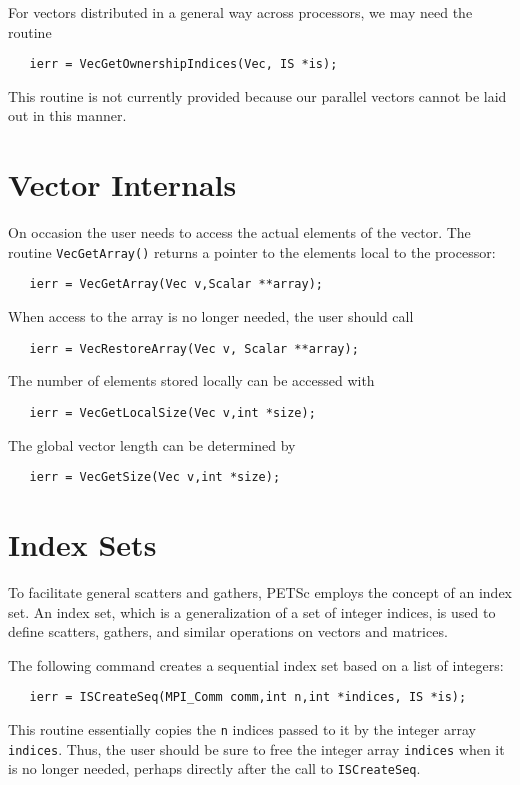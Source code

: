 \begin{design}
For vectors distributed in a general way across processors, we may need
the routine 
\begin{verbatim}
   ierr = VecGetOwnershipIndices(Vec, IS *is);
\end{verbatim}
This routine is not currently provided because our parallel vectors cannot
be laid out in this manner.
\end{design}

\section{Vector Internals}
On occasion the user needs to access the actual elements of the vector. 
The routine {\tt VecGetArray()} 
returns a pointer to the elements local to the processor:
\begin{verbatim}
   ierr = VecGetArray(Vec v,Scalar **array);
\end{verbatim}
When access to the array is no longer needed, the user should call
\begin{verbatim}
   ierr = VecRestoreArray(Vec v, Scalar **array);
\end{verbatim}
The number of elements stored locally can be accessed with
\begin{verbatim}
   ierr = VecGetLocalSize(Vec v,int *size);
\end{verbatim}
The global vector length can be determined by 
\begin{verbatim}
   ierr = VecGetSize(Vec v,int *size);
\end{verbatim}
 
\section{Index Sets} 
To facilitate general scatters and gathers, PETSc employs the 
concept of an index set.  An index set, which is a generalization of a 
set of integer indices, is used to define scatters, gathers, and similar 
operations on vectors and matrices. 

The following command creates a sequential index set based on a list 
of integers: 
\begin{verbatim}
   ierr = ISCreateSeq(MPI_Comm comm,int n,int *indices, IS *is);
\end{verbatim}
This routine essentially copies the {\tt n} indices passed 
to it by the integer array {\tt indices}.  
Thus, the user should be sure to free the integer array {\tt indices} 
when it is no longer needed, perhaps directly after the call to 
{\tt ISCreateSeq}.

